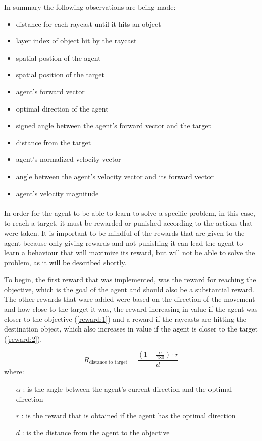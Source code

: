 In summary the following observations are being made:
\begin{itemize}
    \item distance for each raycast until it hits an object
    \item layer index of object hit by the raycast
    \item spatial postion of the agent
    \item spatial position of the target
    \item agent's forward vector
    \item optimal direction of the agent
    \item signed angle between the agent's forward vector and the target
    \item distance from the target
    \item agent's normalized velocity vector
    \item angle between the agent's velocity vector and its forward vector
    \item agent's velocity magnitude
\end{itemize}

\paragraph{}
In order for the agent to be able to learn to solve a specific problem, in this case, to reach a target, it must be rewarded or punished according to the actions that were taken. It is important to be mindful of the rewards that are given to the agent because only giving rewards and not punishing it can lead the agent to learn a behaviour that will maximize its reward, but will not be able to solve the problem, as it will be described shortly.

To begin, the first reward that was implemented, was the reward for reaching the objective, which is the goal of the agent and should also be a substantial reward. The other rewards that ware added were based on the direction of the movement and how close to the target it was, the reward increasing in value if the agent was closer to the objective (\ref{reward:1}) and a reward if the raycasts are hitting the destination object, which also increases in value if the agent is closer to the target (\ref{reward:2}). 

\begin{equation} \label{reward:1}
    R_\text{distance to target} = \frac{(1 - \frac{\alpha}{180}) \cdot r}{d}
\end{equation}
where:
\begin{itemize}
    \item [$\alpha$]: is the angle between the agent's current direction and the optimal direction
    \item [$r$]: is the reward that is obtained if the agent has the optimal direction
    \item [$d$]: is the distance from the agent to the objective
\end{itemize}

